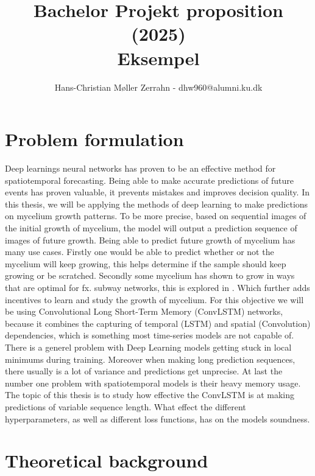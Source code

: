 \documentclass[a4paper,12pt]{article}
\begin{document}
\title{Bachelor Projekt proposition (2025)\\ Eksempel}
\author{\color{red}Hans-Christian Møller Zerrahn - dhw960@alumni.ku.dk}
\date{}
\maketitle

\tableofcontents %
\newpage %
\section{Problem formulation}
Deep learnings neural networks has proven to be an effective method for spatiotemporal forecasting. Being able to make accurate predictions of future events has proven valuable, it prevents mistakes and improves decision quality. In this thesis, we will be applying the methods of deep learning to make predictions on mycelium growth patterns.
To be more precise, based on sequential images of the initial growth of mycelium, the model will output a prediction sequence of images of future growth. Being able to predict future growth of mycelium has many use cases. Firstly one would be able to predict whether or not the mycelium will keep growing, this helps determine if the sample should keep growing or be scratched. Secondly some mycelium has shown to grow in ways that are optimal for fx. subway networks, this is explored in \cite{joseph2022slime}. 
Which further adds incentives to learn and study the growth of mycelium. For this objective we will be using Convolutional Long Short-Term Memory (ConvLSTM) networks, because it combines the capturing of temporal (LSTM) and spatial (Convolution) dependencies, which is something most time-series models are not capable of. There is a generel problem with Deep Learning models getting stuck in local minimums during training. Moreover when making long prediction sequences, there usually is a lot of variance and predictions get unprecise. At last the number one problem with spatiotemporal models is their heavy memory usage.
The topic of this thesis is to study how effective the ConvLSTM is at making predictions of variable sequence length. What effect the different hyperparameters, as well as different loss functions, has on the models soundness.
\section{Theoretical background}
\end{document}
